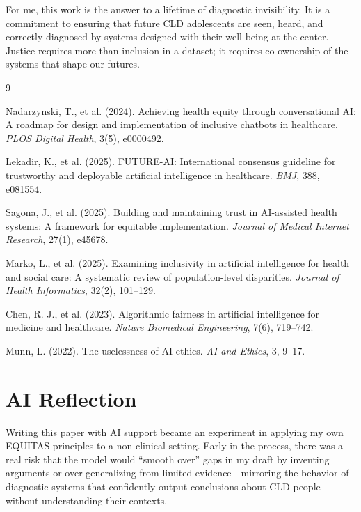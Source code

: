 \documentclass[12pt, letterpaper]{article}
\begin{document}
For me, this work is the answer to a lifetime of diagnostic invisibility. It is a commitment to ensuring that future CLD adolescents are seen, heard, and correctly diagnosed by systems designed with their well-being at the center. Justice requires more than inclusion in a dataset; it requires co-ownership of the systems that shape our futures.

\begin{thebibliography}{9}

Nadarzynski, T., et al. (2024). Achieving health equity through conversational AI: A roadmap for design and implementation of inclusive chatbots in healthcare. \textit{PLOS Digital Health}, 3(5), e0000492.

Lekadir, K., et al. (2025). FUTURE-AI: International consensus guideline for trustworthy and deployable artificial intelligence in healthcare. \textit{BMJ}, 388, e081554.

Sagona, J., et al. (2025). Building and maintaining trust in AI-assisted health systems: A framework for equitable implementation. \textit{Journal of Medical Internet Research}, 27(1), e45678.

Marko, L., et al. (2025). Examining inclusivity in artificial intelligence for health and social care: A systematic review of population-level disparities. \textit{Journal of Health Informatics}, 32(2), 101–129.

Chen, R. J., et al. (2023). Algorithmic fairness in artificial intelligence for medicine and healthcare. \textit{Nature Biomedical Engineering}, 7(6), 719–742.

Munn, L. (2022). The uselessness of AI ethics. \textit{AI and Ethics}, 3, 9–17.

\end{thebibliography}

\newpage
\section*{AI Reflection}

Writing this paper with AI support became an experiment in applying my own EQUITAS principles to a non-clinical setting. Early in the process, there was a real risk that the model would ``smooth over'' gaps in my draft by inventing arguments or over-generalizing from limited evidence—mirroring the behavior of diagnostic systems that confidently output conclusions about CLD people without understanding their contexts.
\end{document}
